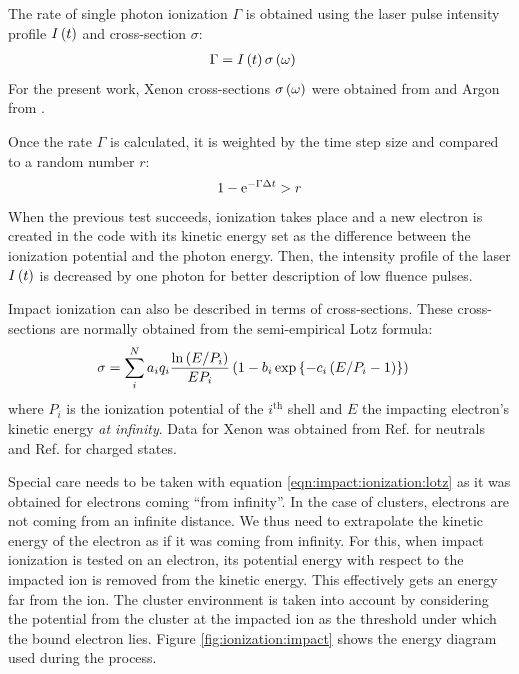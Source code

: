 The rate of single photon ionization $\Gamma$ is obtained using the laser
pulse intensity profile $I\left( t \right)$ and cross-section $\sigma$:
\begin{align}
\Gamma & = I\left( t \right) \sigma\left( \omega \right)
\end{align}
For the present work, Xenon cross-sections $\sigma\left( \omega \right)$ were obtained
from \cite{West1978} and Argon from \cite{Marr1976}.

Once the rate $\Gamma$ is calculated, it is weighted\cite{Lax2006} by the time
step size and compared to a random number $r$:
\begin{align}
1 - \textrm{e}^{-\Gamma \Delta t} > r
\end{align}
When the previous test succeeds, ionization takes place and a new electron is
created in the code with its kinetic energy set as the difference between the
ionization potential and the photon energy. Then, the intensity profile of the
laser $I\left( t \right)$ is decreased by one photon for better description of low fluence
pulses.





Impact ionization can also be described in terms of cross-sections. These
cross-sections are normally obtained from the semi-empirical Lotz
formula\cite{Lotz1967}:
\begin{align}
\sigma & = \sum_{i}^{N} a_i q_i \frac{\ln{\left( E/P_i \right)}}{E P_i} \left( 1 - b_i
\exp{ \left\{ -c_i \left( E/P_i - 1 \right) \right\}} \right)
\label{eqn:impact:ionization:lotz}
\end{align}
where $P_i$ is the ionization potential of the $i^{\textrm{th}}$ shell and $E$
the impacting electron's kinetic energy \textit{at infinity}.
Data for Xenon was obtained from Ref. \cite{Tawara1987} for neutrals
and Ref. \cite{Heidenreich2005} for charged states.

Special care needs to be taken with equation \eqref{eqn:impact:ionization:lotz}
as it was obtained for electrons coming ``from infinity''. In the case of
clusters, electrons are not coming from an infinite distance. We thus need to
extrapolate the kinetic energy of the electron as if it was coming from
infinity. For this, when impact ionization is tested on an electron, its
potential energy with respect to the impacted ion is removed from the kinetic
energy. This effectively gets an energy far from the ion. The cluster
environment is taken into account by considering the potential from the cluster
at the impacted ion as the threshold under which the bound electron lies.
Figure \ref{fig:ionization:impact} shows the energy diagram used during the
process.

